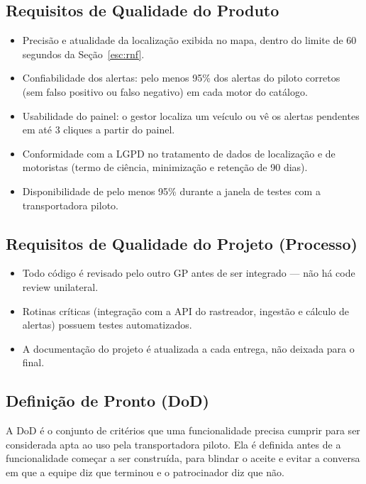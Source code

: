 \documentclass[11pt,a4paper]{article}
\begin{document}
\subsection{Requisitos de Qualidade do Produto}
\begin{itemize}[itemsep=2pt]
  \item Precisão e atualidade da localização exibida no mapa, dentro do limite de 60 segundos da Seção~\ref{esc:rnf}.
  \item Confiabilidade dos alertas: pelo menos 95\% dos alertas do piloto corretos (sem falso positivo ou falso negativo) em cada motor do catálogo.
  \item Usabilidade do painel: o gestor localiza um veículo ou vê os alertas pendentes em até 3 cliques a partir do painel.
  \item Conformidade com a LGPD no tratamento de dados de localização e de motoristas (termo de ciência, minimização e retenção de 90 dias).
  \item Disponibilidade de pelo menos 95\% durante a janela de testes com a transportadora piloto.
\end{itemize}

\subsection{Requisitos de Qualidade do Projeto (Processo)}
\begin{itemize}[itemsep=2pt]
  \item Todo código é revisado pelo outro GP antes de ser integrado --- não há code review unilateral.
  \item Rotinas críticas (integração com a API do rastreador, ingestão e cálculo de alertas) possuem testes automatizados.
  \item A documentação do projeto é atualizada a cada entrega, não deixada para o final.
\end{itemize}

\subsection{Definição de Pronto (DoD)}\label{esc:dod}
A DoD é o conjunto de critérios que uma funcionalidade precisa cumprir para ser considerada apta ao uso pela transportadora piloto. Ela é definida antes de a funcionalidade começar a ser construída, para blindar o aceite e evitar a conversa em que a equipe diz que terminou e o patrocinador diz que não.
\end{document}
